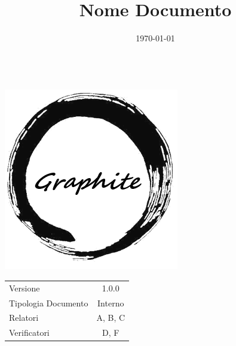 \documentclass[openany,12pt,a4paper]{report}
\title{Nome Documento}
\author{}
\date{\today}
\begin{document}
	\makeatletter
	\begin{titlepage}
		\begin{center}
			{\huge \bfseries  \@title }\\[10em]
			\includegraphics[width=0.5\linewidth]{./img/logo.png} \\[5em]
			
			\begin{tabular}{ l | c }
				Versione & 1.0.0 \\
				Tipologia Documento & Interno \\
				Relatori & A, B, C \\
				Verificatori & D, F \\
				
			\end{tabular}\\[10em]
			{\large \@date}
		\end{center}
	\end{titlepage}
	\makeatother
	\thispagestyle{empty}
	\newpage
	\tableofcontents
	
	
	

	
\end{document}
